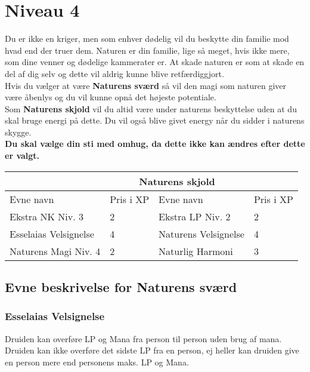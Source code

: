 \chapter{Niveau 4}
Du er ikke en kriger, men som enhver dødelig vil du beskytte din familie mod hvad end der truer dem. Naturen er din familie, lige så meget, hvis ikke mere, som dine venner og dødelige kammerater er. At skade naturen er som at skade en del af dig selv og dette vil aldrig kunne blive retfærdiggjort.\\
Hvis du vælger at være \textbf{Naturens sværd} så vil den magi som naturen giver være åbenlys og du vil kunne opnå det højeste potentiale.\\
Som \textbf{Naturens skjold} vil du altid være under naturens beskyttelse uden at du skal bruge energi på dette. Du vil også blive givet energy når du sidder i naturens skygge.\\

\textbf{Du skal vælge din sti med omhug, da dette ikke kan ændres efter dette er valgt.}\\

\begin{tabular}{|p{}|p{}|p{}|p{}|}
\hline
\rowcolor{cerulean!80}
 \multicolumn{2}{|c|}{ Naturens sværd } & \multicolumn{2}{|c|}{ Naturens skjold }\\
\hline
\rowcolor{cerulean!40}
    Evne navn & Pris i XP & Evne navn & Pris i XP\\ \hline
    Ekstra NK Niv. 3 & 2& Ekstra LP Niv. 2 &2\\\hline
Esselaias Velsignelse & 4& Naturens Velsignelse &4\\\hline
Naturens Magi Niv. 4 & 2& Naturlig Harmoni &3\\\hline
\end{tabular}

\section{Evne beskrivelse for Naturens sværd}



\subsection{Esselaias Velsignelse}
Druiden kan overføre LP og Mana fra person til person uden brug af mana.
Druiden kan ikke overføre det sidste LP fra en person, ej heller kan druiden give
en person mere end personens maks. LP og Mana.

